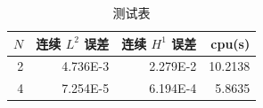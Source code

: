 ﻿\documentclass{ctexart}
\begin{document}
\begin{table}[h]
\centering
\begin{tabular}{r r r r}
\toprule
$N$ & 连续 $L^2$ 误差 & 连续 $H^1$ 误差 & cpu(s) \\
\midrule
2 & 4.736E-3 & 2.279E-2 & 10.2138 \\
4 & 7.254E-5 & 6.194E-4 & 5.8635 \\
\bottomrule
\end{tabular}
\caption{测试表}
\end{table}
\end{document}
